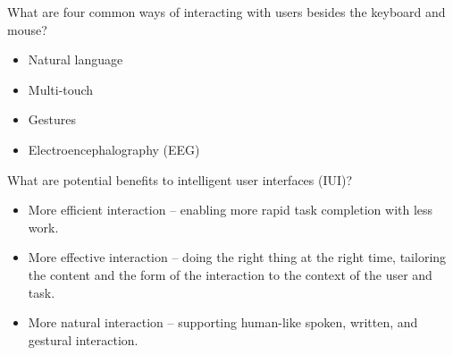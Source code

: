 \begin{flashcard}[Question]{What are four common ways of interacting with users besides the keyboard and mouse?}
\begin{itemize}
\item Natural language
\item Multi-touch
\item Gestures
\item Electroencephalography (EEG)
\end{itemize}
\end{flashcard}

\begin{flashcard}[Question]{What are potential benefits to intelligent user interfaces (IUI)?}
\begin{itemize}
\item More efficient interaction -- enabling more rapid task completion with less work.
\item More effective interaction -- doing the right thing at the right time, tailoring the content and the form of the interaction to the context of the user and task.
\item More natural interaction -- supporting human-like spoken, written, and gestural interaction.
\end{itemize}
\end{flashcard}
